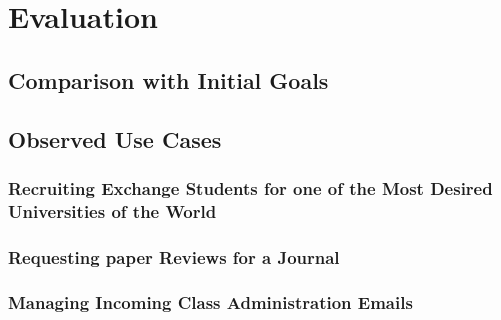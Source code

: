\chapter{Evaluation}
\label{chapter:Evaluation}

\section{Comparison with Initial Goals}

\section{Observed Use Cases}

\subsection{Recruiting Exchange Students for one of the Most Desired Universities of the World}

\subsection{Requesting paper Reviews for a Journal}

\subsection{Managing Incoming Class Administration Emails}


